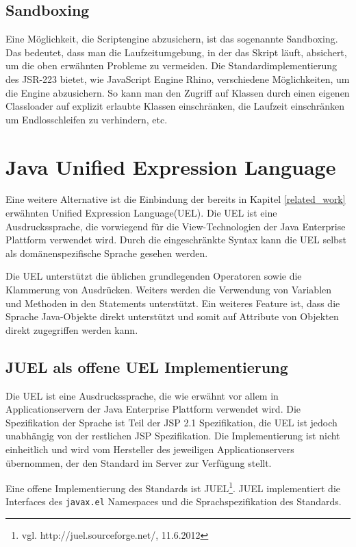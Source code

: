 \subsection{Sandboxing}

Eine Möglichkeit, die Scriptengine abzusichern, ist das sogenannte Sandboxing. Das bedeutet, dass man die Laufzeitumgebung, in der das Skript läuft, absichert, um die oben erwähnten Probleme zu vermeiden. Die Standardimplementierung des JSR-223 bietet, wie JavaScript Engine Rhino, verschiedene Möglichkeiten, um die Engine abzusichern. So kann man den Zugriff auf Klassen durch einen eigenen Classloader auf explizit erlaubte Klassen einschränken\cite{wwwSandboxRhino}, die Laufzeit einschränken um Endlosschleifen zu verhindern, etc.


\section{Java Unified Expression Language}

Eine weitere Alternative ist die Einbindung der bereits in Kapitel \ref{related_work} erwähnten Unified Expression Language(UEL)\cite{UEL}. Die UEL ist eine Ausdruckssprache, die vorwiegend für die View-Technologien der Java Enterprise Plattform verwendet wird. Durch die ein\-ge\-schränk\-te Syntax kann die UEL selbst als domänenspezifische Sprache gesehen werden.

Die UEL unterstützt die üblichen grundlegenden Operatoren sowie die Klammerung von Ausdrücken. Weiters werden die Verwendung von Variablen und Methoden in den Statements unterstützt. Ein weiteres Feature ist, dass die Sprache Java-Objekte direkt unterstützt und somit auf Attribute von Objekten direkt zugegriffen werden kann.

\subsection{JUEL als offene UEL Implementierung}

Die UEL ist eine Ausdruckssprache, die wie erwähnt vor allem in Applicationservern der Java Enterprise Plattform verwendet wird. Die Spezifikation der Sprache ist Teil der JSP 2.1 Spezifikation, die UEL ist jedoch unabhängig von der restlichen JSP Spezifikation. Die Implementierung ist nicht einheitlich und wird vom Hersteller des jeweiligen Applicationservers übernommen, der den Standard im Server zur Verfügung stellt.

Eine offene Implementierung des Standards ist JUEL\footnote{vgl. http://juel.sourceforge.net/, 11.6.2012}. JUEL implementiert die Interfaces des \texttt{javax.el} Namespaces und die Sprachspezifikation des Standards.

